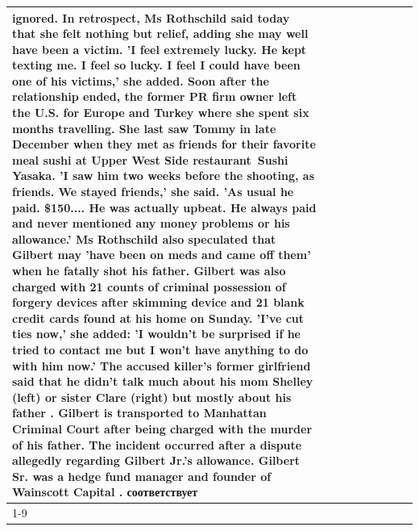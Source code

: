 \begin{table}[H]
\begin{tabular}{lllrlllll}
ignored. In retrospect, Ms Rothschild said today that she felt nothing but relief, adding she may well have been a victim. 'I feel extremely lucky. He kept texting me. I feel so lucky. I feel I could have been one of his victims,' she added. Soon after the relationship ended, the former PR firm owner left the U.S. for Europe and Turkey where she spent six months  travelling. She last saw Tommy in late December when they met as friends for their favorite meal sushi at Upper West Side restaurant Sushi Yasaka. 'I saw him two weeks before the shooting, as friends. We stayed friends,' she said. 'As usual he paid. \$150.... He was actually upbeat. He always paid and never mentioned any money problems or his allowance.' Ms Rothschild also speculated that Gilbert may 'have been on meds and came off them' when he fatally shot his father. Gilbert was also charged with 21 counts of criminal possession of forgery devices after skimming device and 21 blank credit cards found at his home on Sunday. 'I've cut ties now,' she added: 'I wouldn’t be surprised if he tried to contact me but I won’t have anything to do with him now.' The accused killer's former girlfriend said that he didn't talk much about his mom Shelley (left) or sister Clare (right) but mostly about his father . Gilbert is transported to Manhattan Criminal Court  after being charged with the murder of his father. The incident occurred after a dispute allegedly regarding Gilbert Jr.'s allowance. Gilbert Sr. was a hedge fund manager and founder of Wainscott Capital . соответствует \\
\cline{1-9}

\end{tabular}
\end{table}
